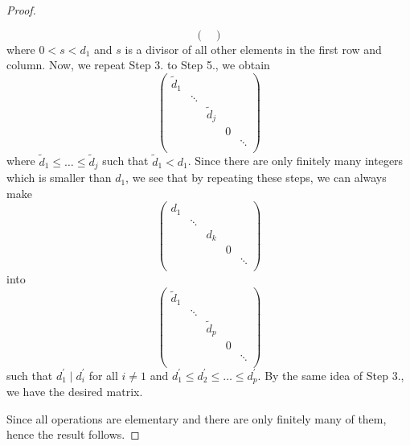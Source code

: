 \begin{proof}
\begin{itemize}
\[\begin{pmatrix}
			      \end{pmatrix}
		      \]
		      where \(0 < s < d_1\) and \(s\) is a divisor of all other elements in the first row and column. Now, we repeat Step 3. to Step 5., we obtain
		      \[
			      \begin{pmatrix}
				      \widetilde{d} _1 &        &                    &   &        \\
				                       & \ddots &                    &   &        \\
				                       &        & \widetilde{d} _{j} &   &        \\
				                       &        &                    & 0 &        \\
				                       &        &                    &   & \ddots \\
			      \end{pmatrix}
		      \]
		      where \(\widetilde{d} _1 \leq \ldots \leq \widetilde{d} _{j}  \) such that \(\widetilde{d} _1 < d_1\). Since there are only finitely many integers which is smaller than \(d_1\), we
		      see that by repeating these steps, we can always make
		      \[
			      \begin{pmatrix}
				      d_1 &        &       &   &        \\
				          & \ddots &       &   &        \\
				          &        & d_{k} &   &        \\
				          &        &       & 0 &        \\
				          &        &       &   & \ddots \\
			      \end{pmatrix}
		      \]
		      into
		      \[
			      \begin{pmatrix}
				      \widetilde{d} _1 &        &                    &   &        \\
				                       & \ddots &                    &   &        \\
				                       &        & \widetilde{d} _{p} &   &        \\
				                       &        &                    & 0 &        \\
				                       &        &                    &   & \ddots \\
			      \end{pmatrix}
		      \]
		      such that \(d_1^\prime \mid d_i^\prime \) for all \(i \neq  1\) and \(d_1^\prime \leq d_2^\prime \leq \ldots \leq d_p^\prime  \). By the same idea of Step 3., we have the desired matrix.
	\end{itemize}
	Since all operations are elementary and there are only finitely many of them, hence the result follows.
\end{proof}


